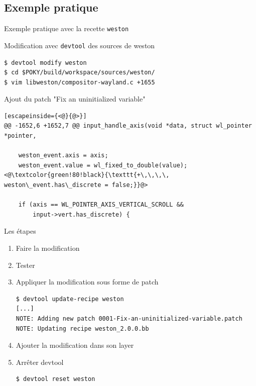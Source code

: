 \documentclass[compress]{smilebeamer}
\begin{document}
\subsection{Exemple pratique}

\begin{frame}
\begin{center}
\huge{Exemple pratique avec la recette \texttt{weston}}
\end{center}
\end{frame}

\begin{frame}[fragile]
Modification avec \texttt{devtool} des sources de weston
\begin{lstlisting}[style=shell]
$ devtool modify weston
$ cd $POKY/build/workspace/sources/weston/
$ vim libweston/compositor-wayland.c +1655
\end{lstlisting}

Ajout du patch "Fix an uninitialized variable"
\begin{lstlisting}[escapeinside={<@}{@>}]
@@ -1652,6 +1652,7 @@ input_handle_axis(void *data, struct wl_pointer *pointer,
 
 	weston_event.axis = axis;
 	weston_event.value = wl_fixed_to_double(value);
<@\textcolor{green!80!black}{\texttt{+\,\,\,\, weston\_event.has\_discrete = false;}}@>
 
 	if (axis == WL_POINTER_AXIS_VERTICAL_SCROLL &&
 	    input->vert.has_discrete) {
\end{lstlisting}
\end{frame}

\begin{frame}[fragile]
Les étapes
\begin{enumerate}
\item Faire la modification
\item Tester
\item Appliquer la modification sous forme de patch
\begin{lstlisting}[style=shell]
$ devtool update-recipe weston
[...]
NOTE: Adding new patch 0001-Fix-an-uninitialized-variable.patch
NOTE: Updating recipe weston_2.0.0.bb
\end{lstlisting}
\item Ajouter la modification dans son layer
\item Arrêter devtool
\begin{lstlisting}[style=shell]
$ devtool reset weston
\end{lstlisting}
\end{enumerate}
\end{frame}
\end{document}
